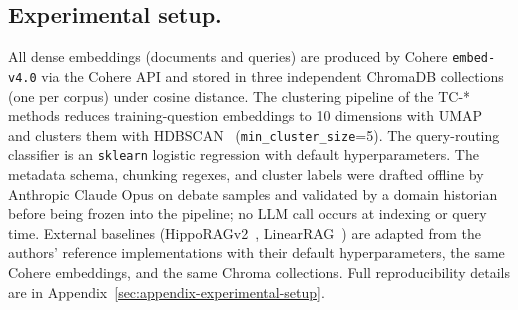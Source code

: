 \subsection{Experimental setup.}
\label{sec:experimental-setup}
All dense embeddings (documents and queries) are produced by Cohere
\texttt{embed-v4.0} via the Cohere API and stored in three independent
ChromaDB collections (one per corpus) under cosine distance. The
clustering pipeline of the TC-* methods reduces training-question
embeddings to 10 dimensions with UMAP~\cite{umap} and clusters them with
HDBSCAN~\cite{hdbscan} (\texttt{min\_cluster\_size}{=}5). The
query-routing classifier is an \texttt{sklearn} logistic regression with
default hyperparameters. The metadata schema, chunking regexes, and
cluster labels were drafted offline by Anthropic Claude Opus on debate samples and validated by a domain historian before
being frozen into the pipeline; no LLM call occurs at indexing or query
time. External baselines (HippoRAGv2~\cite{hipporagv2},
LinearRAG~\cite{linearrag_2025}) are adapted from the authors' reference
implementations with their default hyperparameters, the same Cohere
embeddings, and the same Chroma collections. Full reproducibility
details are in Appendix~\ref{sec:appendix-experimental-setup}.




 
